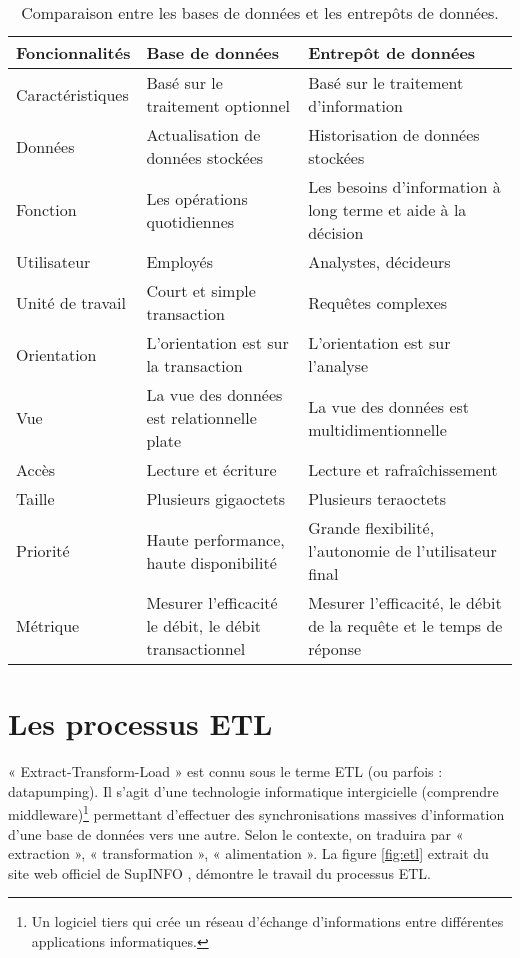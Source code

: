 \begin{table}[H]
    \centering
    \caption{Comparaison entre les bases de données et les entrepôts de données.}
    \begin{tabular}[t]{|p{3cm}|p{6cm}|p{6cm}|} 
        \hline
        \textbf{Foncionnalités} & \textbf{Base de données} & \textbf{Entrepôt de données} \\
        \hline\hline
        Caractéristiques & Basé sur le traitement optionnel & Basé sur le traitement
        d’information \\
        \hline
        Données & Actualisation de données stockées & Historisation de données stockées \\ 
        \hline
        Fonction & Les opérations quotidiennes & Les besoins d’information à long terme et aide à la décision \\ 
        \hline
        Utilisateur & Employés & Analystes, décideurs \\ 
        \hline
        Unité de travail & Court et simple transaction & Requêtes complexes \\ 
        \hline
        Orientation & L’orientation est sur la transaction & L’orientation est sur l’analyse \\ 
        \hline
        Vue & La vue des données est relationnelle plate & La vue des données est multidimentionnelle \\ 
        \hline
        Accès & Lecture et écriture & Lecture et rafraîchissement \\
        \hline
        Taille & Plusieurs gigaoctets & Plusieurs teraoctets \\
        \hline
        Priorité & Haute performance, haute disponibilité & Grande flexibilité, l’autonomie de l’utilisateur final \\
        \hline
        Métrique & Mesurer l’efficacité le débit, le débit transactionnel & Mesurer l’efficacité, le débit de la requête et le temps de réponse \\ 
        \hline\hline
    \end{tabular}
    \label{tab:comparaisonbdded}
\end{table}%



\section{Les processus ETL}
« Extract-Transform-Load » est connu sous le terme ETL (ou parfois : datapumping). Il s'agit d'une technologie informatique intergicielle (comprendre middleware)\footnote{Un logiciel tiers qui crée un réseau d'échange d'informations entre différentes applications informatiques.} permettant d'effectuer des synchronisations massives d'information d'une base de données vers une autre. Selon le contexte, on traduira par « extraction », « transformation », « alimentation ». La figure \ref{fig:etl} extrait du site web officiel de SupINFO \cite{website:1}, démontre le travail du processus ETL. 

